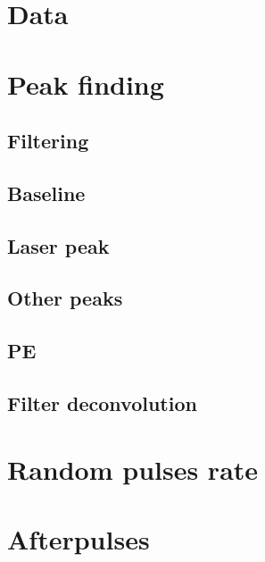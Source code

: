 \section{Data}

\section{Peak finding}

\subsection{Filtering}

\subsection{Baseline}

\subsection{Laser peak}

\subsection{Other peaks}

\subsection{PE}

\subsection{Filter deconvolution}

\section{Random pulses rate}

\section{Afterpulses}

